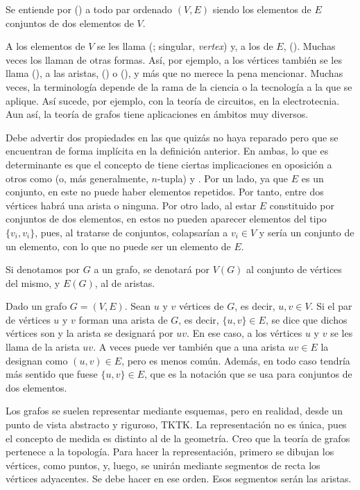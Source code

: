 


\begin{deffinition}[Grafo]
  Se entiende por  () a todo par ordenado $(V, E)$
  siendo los elementos de $E$ conjuntos de dos elementos de $V$.
\end{deffinition}

A los elementos de $V$ se les llama  (; singular,
\emph{vertex}) y, a los de $E$,  (). Muchas veces los
llaman de otras formas. Así, por ejemplo, a los vértices también se les
llama  (), a las aristas,  () o
 (), y más que no merece la pena mencionar. Muchas
veces, la terminología depende de la rama de la ciencia o la tecnología a la
que se aplique. Así sucede, por ejemplo, con la teoría de circuitos, en la
electrotecnia. Aun así, la teoría de grafos tiene aplicaciones en ámbitos
muy diversos.

Debe advertir dos propiedades en las que quizás no haya reparado pero que se
encuentran de forma implícita en la definición anterior. En ambas, lo que es
determinante es que el concepto de  tiene ciertas implicaciones
en oposición a otros como  (o, más generalmente, $n$-tupla)
y . Por un lado, ya que $E$ es un conjunto, en este no
puede haber elementos repetidos. Por tanto, entre dos vértices habrá una
arista o ninguna. Por otro lado, al estar $E$ constituido por conjuntos de
dos elementos, en estos no pueden aparecer elementos del tipo $\{v_i,
v_i\}$, pues, al tratarse de conjuntos, colapsarían a $v_i \in V$ y sería un
conjunto de un elemento, con lo que no puede ser un elemento de $E$.

Si denotamos por $G$ a un grafo, se denotará por $V(G)$ al conjunto de
vértices del mismo, y $E(G)$, al de aristas.

Dado un grafo $G = (V, E)$. Sean $u$ y $v$ vértices de $G$, es decir, $u, v
\in V$. Si el par de vértices $u$ y $v$ forman una arista de $G$, es decir,
$\{u, v\} \in E$, se dice que dichos vértices son  y la arista
se designará por $uv$. En ese caso, a los vértices $u$ y $v$ se les llama
 de la arista $uv$. A veces puede ver también que a una arista
$uv \in E$ la designan como $(u, v) \in E$, pero es menos común. Además, en
todo caso tendría más sentido que fuese $\{u, v\} \in E$, que es la notación
que se usa para conjuntos de dos elementos.

Los grafos se suelen representar mediante esquemas, pero en realidad, desde
un punto de vista abstracto y riguroso, TKTK. La representación no es única,
pues el concepto de medida es distinto al de la geometría. Creo que la
teoría de grafos pertenece a la topología. Para hacer la representación,
primero se dibujan los vértices, como puntos, y, luego, se unirán mediante
segmentos de recta los vértices adyacentes. Se debe hacer en ese orden. Esos
segmentos serán las aristas.

